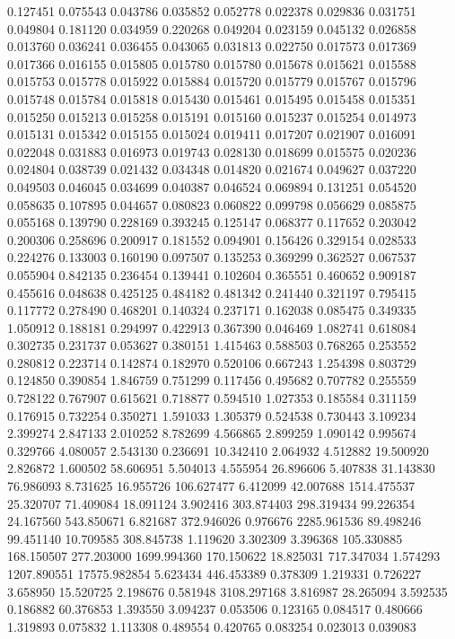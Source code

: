 0.127451
0.075543
0.043786
0.035852
0.052778
0.022378
0.029836
0.031751
0.049804
0.181120
0.034959
0.220268
0.049204
0.023159
0.045132
0.026858
0.013760
0.036241
0.036455
0.043065
0.031813
0.022750
0.017573
0.017369
0.017366
0.016155
0.015805
0.015780
0.015780
0.015678
0.015621
0.015588
0.015753
0.015778
0.015922
0.015884
0.015720
0.015779
0.015767
0.015796
0.015748
0.015784
0.015818
0.015430
0.015461
0.015495
0.015458
0.015351
0.015250
0.015213
0.015258
0.015191
0.015160
0.015237
0.015254
0.014973
0.015131
0.015342
0.015155
0.015024
0.019411
0.017207
0.021907
0.016091
0.022048
0.031883
0.016973
0.019743
0.028130
0.018699
0.015575
0.020236
0.024804
0.038739
0.021432
0.034348
0.014820
0.021674
0.049627
0.037220
0.049503
0.046045
0.034699
0.040387
0.046524
0.069894
0.131251
0.054520
0.058635
0.107895
0.044657
0.080823
0.060822
0.099798
0.056629
0.085875
0.055168
0.139790
0.228169
0.393245
0.125147
0.068377
0.117652
0.203042
0.200306
0.258696
0.200917
0.181552
0.094901
0.156426
0.329154
0.028533
0.224276
0.133003
0.160190
0.097507
0.135253
0.369299
0.362527
0.067537
0.055904
0.842135
0.236454
0.139441
0.102604
0.365551
0.460652
0.909187
0.455616
0.048638
0.425125
0.484182
0.481342
0.241440
0.321197
0.795415
0.117772
0.278490
0.468201
0.140324
0.237171
0.162038
0.085475
0.349335
1.050912
0.188181
0.294997
0.422913
0.367390
0.046469
1.082741
0.618084
0.302735
0.231737
0.053627
0.380151
1.415463
0.588503
0.768265
0.253552
0.280812
0.223714
0.142874
0.182970
0.520106
0.667243
1.254398
0.803729
0.124850
0.390854
1.846759
0.751299
0.117456
0.495682
0.707782
0.255559
0.728122
0.767907
0.615621
0.718877
0.594510
1.027353
0.185584
0.311159
0.176915
0.732254
0.350271
1.591033
1.305379
0.524538
0.730443
3.109234
2.399274
2.847133
2.010252
8.782699
4.566865
2.899259
1.090142
0.995674
0.329766
4.080057
2.543130
0.236691
10.342410
2.064932
4.512882
19.500920
2.826872
1.600502
58.606951
5.504013
4.555954
26.896606
5.407838
31.143830
76.986093
8.731625
16.955726
106.627477
6.412099
42.007688
1514.475537
25.320707
71.409084
18.091124
3.902416
303.874403
298.319434
99.226354
24.167560
543.850671
6.821687
372.946026
0.976676
2285.961536
89.498246
99.451140
10.709585
308.845738
1.119620
3.302309
3.396368
105.330885
168.150507
277.203000
1699.994360
170.150622
18.825031
717.347034
1.574293
1207.890551
17575.982854
5.623434
446.453389
0.378309
1.219331
0.726227
3.658950
15.520725
2.198676
0.581948
3108.297168
3.816987
28.265094
3.592535
0.186882
60.376853
1.393550
3.094237
0.053506
0.123165
0.084517
0.480666
1.319893
0.075832
1.113308
0.489554
0.420765
0.083254
0.023013
0.039083
